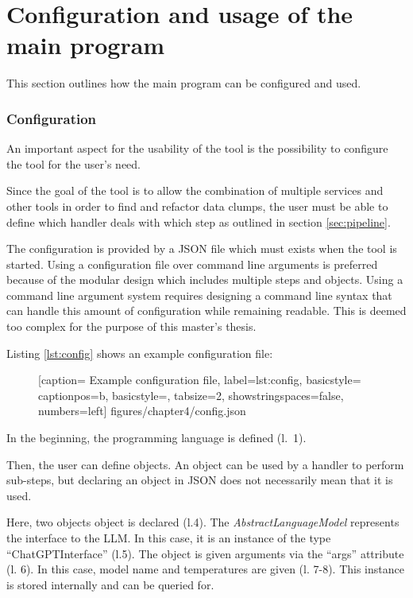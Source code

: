\section{Configuration and usage of the main program}\label{sec:config}
This section outlines how the main program can be configured and used.

\subsubsection{Configuration}
An important aspect for the usability of the tool is the possibility to configure the tool for the user's need. 

Since the goal of the tool is to allow the combination of multiple services and other tools in order to find and refactor data clumps, the user must be able to define which handler deals with which step  as outlined in section \ref{sec:pipeline}.



The configuration is provided by a \ac{JSON} file which must exists when the tool is started. Using a configuration file over  command line arguments is preferred because of the modular design which includes multiple steps and objects. Using a command line argument system  requires designing a command line syntax that can handle this amount of configuration while remaining readable. This is deemed too complex for the purpose of this master's thesis. 


Listing \ref{lst:config} shows an example configuration file:
  \begin{figure} [ht!]
			
			[caption={ Example configuration file},
			label={lst:config}, basicstyle=\footnotesize
			captionpos=b, basicstyle=\footnotesize, tabsize=2, showstringspaces=false,  numbers=left]
			{figures/chapter4/config.json}
		\end{figure}




In the beginning, the programming language is defined (l.~1). 

Then, the user can define objects. An object can be used by a handler to perform sub-steps, but declaring an object in \ac{JSON} does not necessarily mean that it is used. 

Here, two objects object is declared (l.4). The \textit{AbstractLanguageModel} represents the interface to the \ac{LLM}. In this case, it is an instance of the type \enquote{ChatGPTInterface} (l.5). The object is given arguments via the \enquote{args} attribute (l. 6). In this case, model name and temperatures are given (l. 7-8).  This instance is stored internally and can be queried for.   

